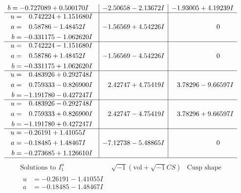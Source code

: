 \documentclass[1p]{elsarticle_modified}
\theoremstyle{definition}
\newcommand{\I}{\sqrt{-1}}
\begin{document}
$$\begin{array}{c|c|c}
\begin{aligned}
b &= -0.727089 + 0.500170 I\end{aligned}
 & -2.50658 - 2.13672 I & -1.93005 + 4.19239 I \\ \hline\begin{aligned}
u &= \phantom{-}0.742224 + 1.151680 I \\
a &= \phantom{-}0.58786 - 1.48452 I \\
b &= -0.331175 - 1.062620 I\end{aligned}
 & -1.56569 + 4.54226 I & \phantom{-0.000000 } 0 \\ \hline\begin{aligned}
u &= \phantom{-}0.742224 - 1.151680 I \\
a &= \phantom{-}0.58786 + 1.48452 I \\
b &= -0.331175 + 1.062620 I\end{aligned}
 & -1.56569 - 4.54226 I & \phantom{-0.000000 } 0 \\ \hline\begin{aligned}
u &= \phantom{-}0.483926 + 0.292748 I \\
a &= \phantom{-}0.759333 - 0.826900 I \\
b &= -1.191780 - 0.427247 I\end{aligned}
 & \phantom{-}2.42747 + 4.75419 I & \phantom{-}3.78296 - 9.66597 I \\ \hline\begin{aligned}
u &= \phantom{-}0.483926 - 0.292748 I \\
a &= \phantom{-}0.759333 + 0.826900 I \\
b &= -1.191780 + 0.427247 I\end{aligned}
 & \phantom{-}2.42747 - 4.75419 I & \phantom{-}3.78296 + 9.66597 I \\ \hline\begin{aligned}
u &= -0.26191 + 1.41055 I \\
a &= -0.18485 + 1.48467 I \\
b &= -0.273685 + 1.126610 I\end{aligned}
 & -7.12738 - 5.48865 I & \phantom{-0.000000 } 0\\
 \hline 
 \end{array}$$\newpage$$\begin{array}{c|c|c}  
\text{Solutions to }I^u_{1}& \I (\text{vol} + \sqrt{-1}CS) & \text{Cusp shape}\\
 \hline 
\begin{aligned}
u &= -0.26191 - 1.41055 I \\
a &= -0.18485 - 1.48467 I \\

\end{aligned}
\end{array}$$
\end{document}
